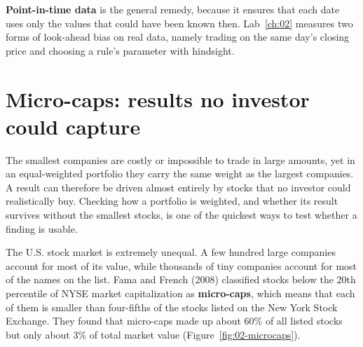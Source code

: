 \textbf{Point-in-time data} is the general remedy, because it ensures that each date uses only the values that could have been known then. Lab~\ref{ch:02} measures two forms of look-ahead bias on real data, namely trading on the same day's closing price and choosing a rule's parameter with hindsight.

\section{Micro-caps: results no investor could capture}
\label{sec:02-microcaps}

The smallest companies are costly or impossible to trade in large amounts, yet in an equal-weighted portfolio they carry the same weight as the largest companies. A result can therefore be driven almost entirely by stocks that no investor could realistically buy. Checking how a portfolio is weighted, and whether its result survives without the smallest stocks, is one of the quickest ways to test whether a finding is usable.

The U.S. stock market is extremely unequal. A few hundred large companies account for most of its value, while thousands of tiny companies account for most of the names on the list. Fama and French (2008) classified stocks below the 20th percentile of NYSE market capitalization as \textbf{micro-caps}, which means that each of them is smaller than four-fifths of the stocks listed on the New York Stock Exchange. They found that micro-caps made up about 60\% of all listed stocks but only about 3\% of total market value (Figure~\ref{fig:02-microcaps}).




